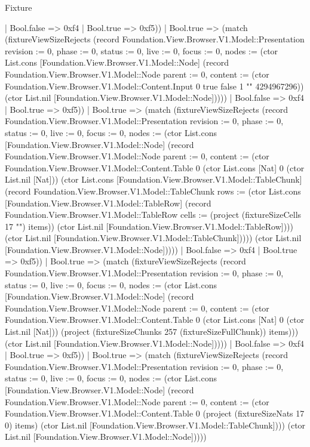\begin{lexlean}{Fixture}
\begin{semanticmodule}
{                      | Bool.false => 0xf4
                      | Bool.true => 0xf5))
                  | Bool.true => (match (fixtureViewSizeRejects (record Foundation.View.Browser.V1.Model::Presentation {revision := 0, phase := 0, status := 0, live := 0, focus := 0, nodes := (ctor List.cons [Foundation.View.Browser.V1.Model::Node] (record Foundation.View.Browser.V1.Model::Node {parent := 0, content := (ctor Foundation.View.Browser.V1.Model::Content.Input 0 true false 1 "" 4294967296)}) (ctor List.nil [Foundation.View.Browser.V1.Model::Node]))}))
                    | Bool.false => 0xf4
                    | Bool.true => 0xf5))
                | Bool.true => (match (fixtureViewSizeRejects (record Foundation.View.Browser.V1.Model::Presentation {revision := 0, phase := 0, status := 0, live := 0, focus := 0, nodes := (ctor List.cons [Foundation.View.Browser.V1.Model::Node] (record Foundation.View.Browser.V1.Model::Node {parent := 0, content := (ctor Foundation.View.Browser.V1.Model::Content.Table 0 (ctor List.cons [Nat] 0 (ctor List.nil [Nat])) (ctor List.cons [Foundation.View.Browser.V1.Model::TableChunk] (record Foundation.View.Browser.V1.Model::TableChunk {rows := (ctor List.cons [Foundation.View.Browser.V1.Model::TableRow] (record Foundation.View.Browser.V1.Model::TableRow {cells := (project (fixtureSizeCells 17 "") items)}) (ctor List.nil [Foundation.View.Browser.V1.Model::TableRow]))}) (ctor List.nil [Foundation.View.Browser.V1.Model::TableChunk])))}) (ctor List.nil [Foundation.View.Browser.V1.Model::Node]))}))
                  | Bool.false => 0xf4
                  | Bool.true => 0xf5))
              | Bool.true => (match (fixtureViewSizeRejects (record Foundation.View.Browser.V1.Model::Presentation {revision := 0, phase := 0, status := 0, live := 0, focus := 0, nodes := (ctor List.cons [Foundation.View.Browser.V1.Model::Node] (record Foundation.View.Browser.V1.Model::Node {parent := 0, content := (ctor Foundation.View.Browser.V1.Model::Content.Table 0 (ctor List.cons [Nat] 0 (ctor List.nil [Nat])) (project (fixtureSizeChunks 257 (fixtureSizeFullChunk)) items))}) (ctor List.nil [Foundation.View.Browser.V1.Model::Node]))}))
                | Bool.false => 0xf4
                | Bool.true => 0xf5))
            | Bool.true => (match (fixtureViewSizeRejects (record Foundation.View.Browser.V1.Model::Presentation {revision := 0, phase := 0, status := 0, live := 0, focus := 0, nodes := (ctor List.cons [Foundation.View.Browser.V1.Model::Node] (record Foundation.View.Browser.V1.Model::Node {parent := 0, content := (ctor Foundation.View.Browser.V1.Model::Content.Table 0 (project (fixtureSizeNats 17 0) items) (ctor List.nil [Foundation.View.Browser.V1.Model::TableChunk]))}) (ctor List.nil [Foundation.View.Browser.V1.Model::Node]))}))
}
\end{semanticmodule}
\end{lexlean}
